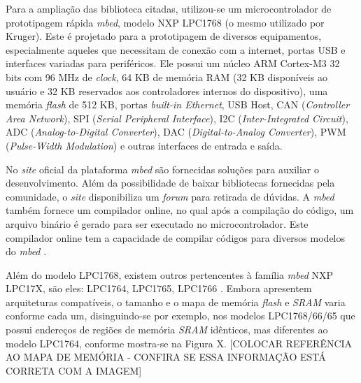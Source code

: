 Para a ampliação das biblioteca citadas, utilizou-se um microcontrolador de prototipagem rápida \textit{mbed}, modelo NXP LPC1768 \cite{lpc1768:2016} (o mesmo utilizado por Kruger). Este é projetado para a prototipagem de diversos equipamentos, especialmente aqueles que necessitam de conexão com a internet, portas USB e interfaces variadas para periféricos. Ele possui um núcleo ARM Cortex-M3 32 bits com 96 MHz de \textit{clock}, 64 KB de memória RAM (32 KB disponíveis ao usuário e 32 KB reservados aos controladores internos do dispositivo), uma memória \textit{flash} de 512 KB, portas \textit{built-in Ethernet}, USB Host, CAN (\textit{Controller Area Network}), SPI (\textit{Serial Peripheral Interface}), I2C (\textit{Inter-Integrated Circuit}), ADC (\textit{Analog-to-Digital Converter}), DAC (\textit{Digital-to-Analog Converter}), PWM (\textit{Pulse-Width Modulation}) e outras interfaces de entrada e saída.

No \textit{site} oficial da plataforma \textit{mbed} são fornecidas soluções para auxiliar o desenvolvimento. Além da possibilidade de baixar bibliotecas fornecidas pela comunidade, o \textit{site} disponibiliza um \textit{forum} para retirada de dúvidas. A \textit{mbed} também fornece um compilador online, no qual após a compilação do código, um arquivo binário é gerado para ser executado no microcontrolador. Este compilador online tem a capacidade de compilar códigos para diversos modelos do \textit{mbed} \cite{mbedCompiler:2016}.

Além do modelo LPC1768, existem outros pertencentes à família \textit{mbed} NXP LPC17X, são eles: LPC1764, LPC1765, LPC1766 \cite{manualLpc176x:2016}. Embora apresentem arquiteturas compatíveis, o tamanho e o mapa de memória \textit{flash} e \textit{SRAM} varia conforme cada um, disinguindo-se por exemplo, nos modelos LPC1768/66/65 que possui endereços de regiões de memória \textit{SRAM} idênticos, mas diferentes ao modelo LPC1764, conforme mostra-se na Figura X. [COLOCAR REFERÊNCIA AO MAPA DE MEMÓRIA - CONFIRA SE ESSA INFORMAÇÃO ESTÁ CORRETA COM A IMAGEM]


